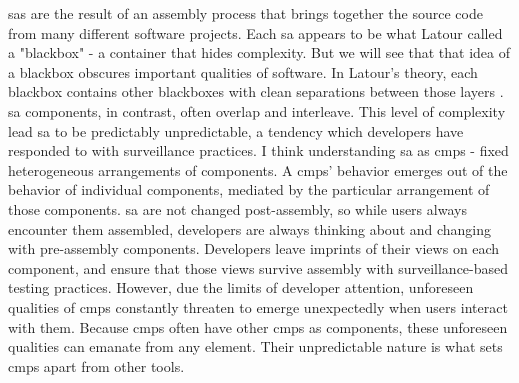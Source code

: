 \documentclass[a4paper,man,natbib,floatsintext]{apa6}
\begin{document}
   \Glspl{sa} are the result of an assembly process that brings together the source code from many different software projects. Each \gls{sa} appears to be what Latour called a "blackbox" - a container that hides complexity. But we will see that that idea of a blackbox obscures important qualities of software. In Latour's theory, each blackbox contains other blackboxes with clean separations between those layers \citep[p. 183]{Latour1999-ui}. \Gls{sa} components, in contrast, often overlap and interleave. This level of complexity lead \gls{sa} to be predictably unpredictable, a tendency which developers have responded to with surveillance practices. I think understanding \gls{sa} as \glspl{cmp} - fixed heterogeneous arrangements of components. A \glspl{cmp}' behavior emerges out of the behavior of individual components, mediated by the particular arrangement of those components. \Gls{sa} are not changed post-assembly, so while users always encounter them assembled, developers are always thinking about and changing with pre-assembly components. Developers leave imprints of their views on each component, and ensure that those views survive assembly with surveillance-based testing practices. However, due the limits of developer attention, unforeseen qualities of \glspl{cmp} constantly threaten to emerge unexpectedly when users interact with them. Because \glspl{cmp} often have other \glspl{cmp} as components, these unforeseen qualities can emanate from any element. Their unpredictable nature is what sets \glspl{cmp} apart from other tools.



  
\end{document}
